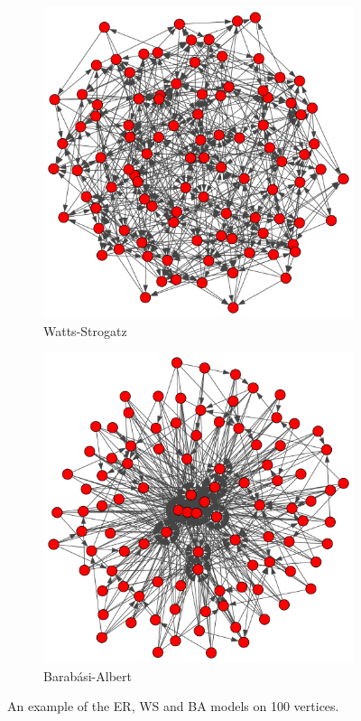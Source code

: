 \begin{figure}[ht]
\begin{subfigure}{.3 \linewidth}
    \includegraphics[scale=0.2]{random_graphs/strogatz100v5m05prob.pdf}
    \caption{Watts-Strogatz}
  \end{subfigure}%
  \begin{subfigure}{.3 \linewidth}

    \includegraphics[scale=0.2]{random_graphs/barabasi100em5.pdf}
    \caption{Barabási-Albert}
  \end{subfigure}
  \caption{\label{graphexamples} An example of the ER, WS and BA models on 100 vertices.}
\end{figure}

